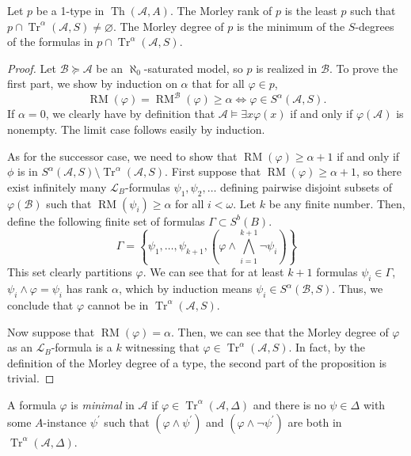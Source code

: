 \documentclass{article}
\DeclareMathOperator{\Th}{Th}
\DeclareMathOperator{\Tr}{Tr}
\DeclareMathOperator{\RM}{RM}
\let\mc\mathcal
\begin{document}
\begin{proposition}\label{morley}
    Let $p$ be a 1-type in $\Th(\mc{A}, A)$. The Morley rank of $p$ is the least $p$ such that $p \cap \Tr^{\alpha}(\mc{A}, S) \neq \varnothing$. The Morley degree of $p$ is the minimum of the $S$-degrees of the formulas in $p \cap \Tr^{\alpha}(\mc{A}, S)$.
\end{proposition}

\begin{proof}
    Let $\mc{B} \succeq \mc{A}$ be an $\aleph_0$-saturated model, so $p$ is realized in $\mc{B}$. To prove the first part, we show by induction on $\alpha$ that for all $\varphi \in p$,
    \[ \RM(\varphi) = \RM^{\mc{B}}(\varphi) \geq \alpha \Leftrightarrow \varphi \in S^{\alpha}(\mc{A}, S). \]
    If $\alpha = 0$, we clearly have by definition that $\mc{A} \vDash \exists x \varphi(x)$ if and only if $\varphi(\mc{A})$ is nonempty. The limit case follows easily by induction.

    As for the successor case, we need to show that $\RM(\varphi) \geq \alpha + 1$ if and only if $\phi$ is in $S^{\alpha}(\mc{A}, S) \setminus \Tr^{\alpha}(\mc{A}, S)$. First suppose that $\RM(\varphi) \geq \alpha + 1$, so there exist infinitely many $\mc{L}_B$-formulas $\psi_1, \psi_2, \ldots$ defining pairwise disjoint subsets of $\varphi(\mc{B})$ such that $\RM(\psi_i) \geq \alpha$ for all $i < \omega$. Let $k$ be any finite number. Then, define the following finite set of formulas $\Gamma \subset S^b(B)$.
    \[ \Gamma = \left\{ \psi_1, \ldots, \psi_{k+1}, \left( \varphi \land \bigwedge_{i=1}^{k+1} \neg \psi_i \right) \right\} \]
    This set clearly partitions $\varphi$. We can see that for at least $k+1$ formulas $\psi_i \in \Gamma$, $\psi_i \land \varphi = \psi_i$ has rank $\alpha$, which by induction means $\psi_i \in S^{\alpha}(\mc{B}, S)$. Thus, we conclude that $\varphi$ cannot be in $\Tr^{\alpha}(\mc{A}, S)$.

    Now suppose that $\RM(\varphi) = \alpha$. Then, we can see that the Morley degree of $\varphi$ as an $\mc{L}_B$-formula is a $k$ witnessing that $\varphi \in \Tr^{\alpha}(\mc{A}, S)$. In fact, by the definition of the Morley degree of a type, the second part of the proposition is trivial.
\end{proof}

\begin{definition}[Minimality]
    A formula $\varphi$ is \textit{minimal} in $\mc{A}$ if $\varphi \in \Tr^{\alpha}(\mc{A}, \Delta)$ and there is no $\psi \in \Delta$ with some $A$-instance $\psi^{\prime}$ such that $(\varphi \land \psi^{\prime})$ and $(\varphi \land \neg \psi^{\prime})$ are both in $\Tr^{\alpha}(\mc{A}, \Delta)$.
\end{definition}
\end{document}
